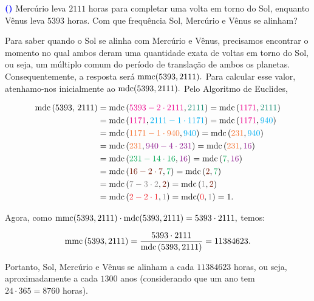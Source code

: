 \documentclass[12pt, a4paper]{article}
\newcommand{\mdc}{{\rm mdc}}
\newcommand{\mmc}{{\rm mmc}}
\newcounter{exercicio}[section]
\newenvironment{exercicio}[1][]{\refstepcounter{exercicio}\par\medskip
 \textcolor{blue}{\bf(\theexercicio)} \rmfamily}{\medskip }
\begin{document}
\begin{exercicio}
 Mercúrio leva $2111$ horas para completar uma volta em torno do Sol, enquanto Vênus leva $5393$ horas. Com que frequência Sol, Mercúrio e Vênus se alinham?
\end{exercicio}
\begin{solution}
Para saber quando o Sol se alinha com Mercúrio e Vênus, precisamos encontrar o momento no qual ambos deram uma quantidade exata de voltas em torno do Sol, ou seja, um múltiplo comum do período de translação de ambos os planetas. Consequentemente, a resposta será $\mmc( 5393, 2111).$ Para calcular esse valor, atenhamo-nos inicialmente ao $\mdc(5393, 2111).$ Pelo Algoritmo de Euclides,

   \begin{align*}
    \mdc \left( \text{5393, 2111} \right)&=\mdc \left( \textcolor{Magenta}{5393-2\cdot2111}, \textcolor{PineGreen}{2111} \right) =\mdc \left( \textcolor{Magenta}{1171}, \textcolor{PineGreen}{2111} \right)\\& =\mdc \left( \textcolor{Magenta}{1171}, \textcolor{Cyan}{2111-1\cdot1171} \right) =
    \mdc \left( \textcolor{Magenta}{1171}, \textcolor{Cyan}{940} \right)\\&=\mdc \left( \textcolor{Orange}{1171-1\cdot940}, \textcolor{Cyan}{940} \right) =\mdc \left( \textcolor{Orange}{231}, \textcolor{Cyan}{940} \right)\\& =\mdc \left( \textcolor{Orange}{231}, \textcolor{Plum}{940-4\cdot231} \right) =\mdc \left( \textcolor{Orange}{231}, \textcolor{Plum}{16} \right)\\& =
    \mdc \left( \textcolor{Green}{231-14\cdot16} , \textcolor{Plum}{16} \right) =\mdc \left( \textcolor{Green}{7}, \textcolor{Plum}{16} \right) \\&= \mdc \left( \textcolor{Brown}{16 - 2 \cdot 7}, \textcolor{Green}{7} \right) = \mdc \left( \textcolor{Brown}{2}, \textcolor{Green}{7} \right) \\&= \mdc \left( \textcolor{Gray}{7 - 3 \cdot 2}, \textcolor{Brown}{2} \right) = \mdc \left( \textcolor{Gray}{1}, \textcolor{Brown}{2} \right) \\&=
    \mdc \left( \textcolor{Red}{2 - 2 \cdot 1}, \textcolor{Gray}{1} \right) = \mdc(  \textcolor{Red}{0}, \textcolor{Gray}{1} ) = 1.
    \end{align*}
    
 Agora, como $\mmc(5393, 2111) \cdot \mdc( 5393, 2111) = 5393 \cdot 2111,$ temos:

    
    $$\mmc \left(5393, 2111 \right) =\frac{5393\cdot2111}{\mdc \left( 5393, 2111\right) }=11384623.$$

Portanto, Sol, Mercúrio e Vênus se alinham a cada $11384623$ horas, ou seja, aproximadamente a cada $1300$ anos (considerando que um ano tem $24 \cdot 365 = 8760$ horas).

\end{solution}
\end{document}
